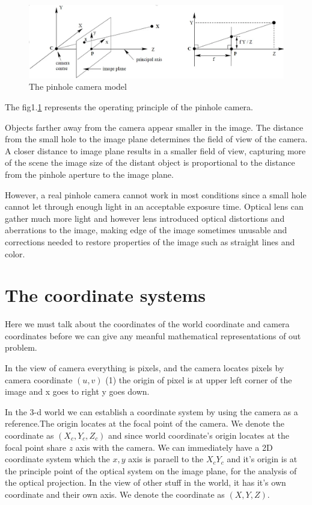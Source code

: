 \documentclass{article}
\begin{document}
\begin{figure}[h!]
    \includegraphics[width=\linewidth]{fig1.1.png}
    \caption{The pinhole camera model}\label{fig:1.1}
\end{figure}

The fig1.\ref{fig:1.1} represents the operating principle of the pinhole camera.

Objects farther away from the camera appear smaller in the image. The distance from the small hole to the image plane determines the field of view of the camera. A closer distance to image plane results in a smaller field of view, capturing more of the scene the image size of the distant object is proportional to the distance from the pinhole aperture to the image plane.

However, a real pinhole camera cannot work in most conditions since a small hole cannot let through enough light in an acceptable exposure time. Optical lens can gather much more light and however lens introduced optical distortions and aberrations to the image, making edge of the image sometimes unusable and corrections needed to restore properties of the image such as straight lines and color.

\section{The coordinate systems}
Here we must talk about the coordinates of the world coordinate and camera coordinates before we can give any meanful mathematical representations of out problem.

In the view of camera everything is pixels, and the camera locates pixels by camera coordinate $(u,v)$ (1) the origin of pixel is at upper left corner of the image and x goes to right y goes down.

In the 3-d world we can establish a coordinate system by using the camera as a reference.The origin locates at the focal point of the camera. We denote the coordinate as
 $(X_c,Y_c,Z_c)$ 
 and since world coordinate's origin locates at the focal point share $z$ axis with the camera. We can immediately have a 2D coordinate system which the $x,y$ axis is paraell to the $X_c Y_c$ and it's origin is at the principle point of the optical system on the image plane, for the analysis of the optical projection.
In the view of other stuff in the world, it has it's own coordinate and their own axis. We denote the coordinate as $(X,Y,Z)$.
\end{document}
